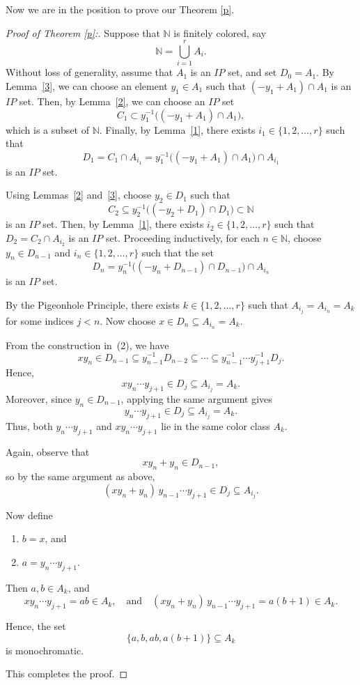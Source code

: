 \documentclass{aic}
\begin{document}
Now we are in the position to prove our Theorem \ref{p}.

\begin{proof}[Proof of  Theorem \ref{p}:] Suppose that \( \mathbb{N} \) is finitely colored, say  
\[
\mathbb{N} = \bigcup_{i=1}^r A_i.
\]
Without loss of generality, assume that \( A_1 \) is an \( IP \) set, and set \( D_0 = A_1 \).
By Lemma~\ref{3}, we can choose an element \( y_1 \in A_1 \) such that 
\( (-y_1 + A_1) \cap A_1 \) is an \( IP \) set. 
Then, by Lemma~\ref{2}, we can choose an $IP$ set
\[
C_1 \subset y_1^{-1}\big( (-y_1 + A_1) \cap A_1 \big),
\]
which is a subset of \( \mathbb{N} \). 
Finally, by Lemma~\ref{1}, there exists \( i_1 \in \{1, 2, \ldots, r\} \) such that
\[
D_1 = C_1 \cap A_{i_1}
     = y_1^{-1}\big( (-y_1 + A_1) \cap A_1 \big) \cap A_{i_1}
\]
is an \( IP \) set.





Using Lemmas~\ref{2} and~\ref{3}, choose \( y_2 \in D_1 \) such that 
\[
C_2 \subseteq y_2^{-1}\big( (-y_2 + D_1) \cap D_1 \big) \subset \mathbb{N}
\]
is an \( IP \) set. 
Then, by Lemma~\ref{1}, there exists \( i_2 \in \{1,2,\ldots,r\} \) such that 
\( D_2 = C_2 \cap A_{i_2} \) is an \( IP \) set.
Proceeding inductively, for each \( n \in \mathbb{N} \), choose \( y_n \in D_{n-1} \) and \( i_n \in \{1,2,\ldots,r\} \) such that the set 
    \[
    D_n = y_n^{-1}\big( (-y_n + D_{n-1}) \cap D_{n-1} \big) \cap A_{i_n}
    \]
    is an \( IP \) set.
    



By the Pigeonhole Principle, there exists \( k \in \{1,2,\ldots,r\} \) such that 
\( A_{i_j} = A_{i_n} = A_k \) for some indices \( j < n \).
Now choose \( x \in D_n \subseteq A_{i_n} = A_k \).

From the construction in~(2), we have
\[
x y_n \in D_{n-1} \subseteq y_{n-1}^{-1} D_{n-2} \subseteq \cdots \subseteq 
y_{n-1}^{-1} \cdots y_{j+1}^{-1} D_j.
\]
Hence,
\[
x y_n \cdots y_{j+1} \in D_j \subseteq A_{i_j} = A_k.
\]
Moreover, since \( y_n \in D_{n-1} \), applying the same argument gives
\[
y_n \cdots y_{j+1} \in D_j \subseteq A_{i_j} = A_k.
\]
Thus, both \( y_n \cdots y_{j+1} \) and \( x y_n \cdots y_{j+1} \) lie in the same color class \( A_k \).


Again, observe that 
\[
x y_n + y_n \in D_{n-1},
\] 
so by the same argument as above,
\[
(x y_n + y_n) \, y_{n-1} \cdots y_{j+1} \in D_j \subseteq A_{i_j}.
\]

Now define
\begin{enumerate}
    \item \( b = x \), and
    \item  \( a = y_n \cdots y_{j+1} \).
\end{enumerate}

Then \( a, b \in A_k \), and
\[
x y_n \cdots y_{j+1} = a b \in A_k, \quad \text{and} \quad 
(x y_n + y_n) \, y_{n-1} \cdots y_{j+1} = a(b+1) \in A_k.
\]

Hence, the set
\[
\{a, b, ab, a(b+1)\} \subseteq A_k
\]
is monochromatic. 

This completes the proof.

    
\end{proof}
\end{document}
